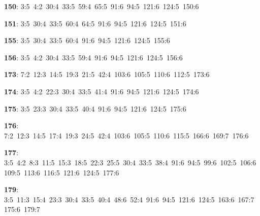 \noindent \textbf{150}: 3:5\allowbreak\ 4:2\allowbreak\ 30:4\allowbreak\ 33:5\allowbreak\ 59:4\allowbreak\ 65:5\allowbreak\ 91:6\allowbreak\ 94:5\allowbreak\ 121:6\allowbreak\ 124:5\allowbreak\ 150:6\par
\noindent \textbf{151}: 3:5\allowbreak\ 30:4\allowbreak\ 33:5\allowbreak\ 60:4\allowbreak\ 64:5\allowbreak\ 91:6\allowbreak\ 94:5\allowbreak\ 121:6\allowbreak\ 124:5\allowbreak\ 151:6\par
\noindent \textbf{155}: 3:5\allowbreak\ 30:4\allowbreak\ 33:5\allowbreak\ 60:4\allowbreak\ 91:6\allowbreak\ 94:5\allowbreak\ 121:6\allowbreak\ 124:5\allowbreak\ 155:6\par
\noindent \textbf{156}: 3:5\allowbreak\ 4:2\allowbreak\ 30:4\allowbreak\ 33:5\allowbreak\ 59:4\allowbreak\ 91:6\allowbreak\ 94:5\allowbreak\ 121:6\allowbreak\ 124:5\allowbreak\ 156:6\par
\noindent \textbf{173}: 7:2\allowbreak\ 12:3\allowbreak\ 14:5\allowbreak\ 19:3\allowbreak\ 21:5\allowbreak\ 42:4\allowbreak\ 103:6\allowbreak\ 105:5\allowbreak\ 110:6\allowbreak\ 112:5\allowbreak\ 173:6\par
\noindent \textbf{174}: 3:5\allowbreak\ 4:2\allowbreak\ 22:3\allowbreak\ 30:4\allowbreak\ 33:5\allowbreak\ 41:4\allowbreak\ 91:6\allowbreak\ 94:5\allowbreak\ 121:6\allowbreak\ 124:5\allowbreak\ 174:6\par
\noindent \textbf{175}: 3:5\allowbreak\ 23:3\allowbreak\ 30:4\allowbreak\ 33:5\allowbreak\ 40:4\allowbreak\ 91:6\allowbreak\ 94:5\allowbreak\ 121:6\allowbreak\ 124:5\allowbreak\ 175:6\par
\noindent \textbf{176}: 7:2\allowbreak\ 12:3\allowbreak\ 14:5\allowbreak\ 17:4\allowbreak\ 19:3\allowbreak\ 24:5\allowbreak\ 42:4\allowbreak\ 103:6\allowbreak\ 105:5\allowbreak\ 110:6\allowbreak\ 115:5\allowbreak\ 166:6\allowbreak\ 169:7\allowbreak\ 176:6\par
\noindent \textbf{177}: 3:5\allowbreak\ 4:2\allowbreak\ 8:3\allowbreak\ 11:5\allowbreak\ 15:3\allowbreak\ 18:5\allowbreak\ 22:3\allowbreak\ 25:5\allowbreak\ 30:4\allowbreak\ 33:5\allowbreak\ 38:4\allowbreak\ 91:6\allowbreak\ 94:5\allowbreak\ 99:6\allowbreak\ 102:5\allowbreak\ 106:6\allowbreak\ 109:5\allowbreak\ 113:6\allowbreak\ 116:5\allowbreak\ 121:6\allowbreak\ 124:5\allowbreak\ 177:6\par
\noindent \textbf{179}: 3:5\allowbreak\ 11:3\allowbreak\ 15:4\allowbreak\ 23:3\allowbreak\ 30:4\allowbreak\ 33:5\allowbreak\ 40:4\allowbreak\ 48:6\allowbreak\ 52:4\allowbreak\ 91:6\allowbreak\ 94:5\allowbreak\ 121:6\allowbreak\ 124:5\allowbreak\ 163:6\allowbreak\ 167:7\allowbreak\ 175:6\allowbreak\ 179:7\par
